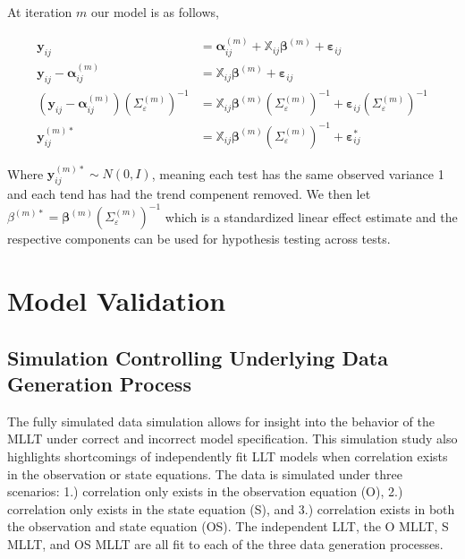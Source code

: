 \documentclass[
]{article}
\begin{document}
At iteration \(m\) our model is as follows,

\begin{equation*}
\begin{aligned}
\boldsymbol{y}_{ij} &= \boldsymbol{\alpha}_{ij}^{(m)} + \boldsymbol{ \mathbb{X}}_{ij} \boldsymbol{\beta}^{(m)} + \boldsymbol{\varepsilon}_{ij}\\
\boldsymbol{y}_{ij}-\boldsymbol{\alpha}_{ij}^{(m)} &=   \boldsymbol{ \mathbb{X}}_{ij} \boldsymbol{\beta}^{(m)} + \boldsymbol{\varepsilon}_{ij}\\
(\boldsymbol{y}_{ij}-\boldsymbol{\alpha}_{ij}^{(m)})(\Sigma_{\varepsilon}^{(m)})^{-1} &=   \boldsymbol{ \mathbb{X}}_{ij} \boldsymbol{\beta}^{(m)}(\Sigma_{\varepsilon}^{(m)})^{-1} + \boldsymbol{\varepsilon}_{ij}(\Sigma_{\varepsilon}^{(m)})^{-1}\\
\boldsymbol{y}_{ij}^{(m)*} &= \boldsymbol{ \mathbb{X}}_{ij} \boldsymbol{\beta}^{(m)}(\Sigma_{\varepsilon}^{(m)})^{-1} + \boldsymbol{\varepsilon}_{ij}^*
\end{aligned}
\end{equation*}

Where \(\boldsymbol{y}_{ij}^{(m)*}\sim N(0, I)\), meaning each test has the same observed variance 1 and each tend has had the trend compenent removed. We then let \(\beta^{(m)*} = \boldsymbol{\beta}^{(m)}(\Sigma_{\varepsilon}^{(m)})^{-1}\) which is a standardized linear effect estimate and the respective components can be used for hypothesis testing across tests.

\hypertarget{model-validation}{%
\section{Model Validation}\label{model-validation}}

\hypertarget{simulation-controlling-underlying-data-generation-process}{%
\subsection{Simulation Controlling Underlying Data Generation Process}\label{simulation-controlling-underlying-data-generation-process}}

The fully simulated data simulation allows for insight into the behavior of the MLLT under correct and incorrect model specification. This simulation study also highlights shortcomings of independently fit LLT models when correlation exists in the observation or state equations. The data is simulated under three scenarios: 1.) correlation only exists in the observation equation (O), 2.) correlation only exists in the state equation (S), and 3.) correlation exists in both the observation and state equation (OS). The independent LLT, the O MLLT, S MLLT, and OS MLLT are all fit to each of the three data generation processes.
\end{document}
